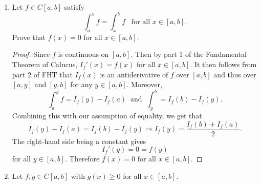 \documentclass[12pt]{article}
\begin{document}
\begin{enumerate}
\begin{proof}
                \begin{align*}
                    U(f, P)-L(f, P) &= \sum_{i=1}^{n}M_i\Delta
                    x_i-\sum_{i=1}^{n}m_i\Delta x_i \\
                    &=\sum_{i=1}^{n}(M_i-m_i)\Delta x_i \\
                    &=\sum_{i=1}^{n}(f(x_i)-f(x_{i-1}))\delta \\
                    &=\delta(f(b)-f(a)) \\
                    &<\frac{\varepsilon}{f(b)-f(a)}(f(b)-f(a))=\varepsilon.
                \end{align*}
                Therefore $f\in\mathcal{R}[a, b]$. 
            \end{proof}
        \item Let $f\in C[a, b]$ satisfy
            \begin{equation*}
                \int_{a}^{x}f=\int_{x}^bf\;\;\;\text{for all $x\in[a, b]$.}
            \end{equation*}
            Prove that $f(x)=0$ for all $x\in[a, b]$. 
            \begin{proof}
                Since $f$ is continuous on $[a, b]$. Then by part 1 of
                the Fundamental Theorem of Calucus, $I_f'(x)=f(x)$ for all
                $x\in[a, b]$. It then follows from part 2 of FHT that $I_f(x)$
                is an antiderivative of $f$ over $[a, b]$ and thus over $[a,
                y]$ and $[y, b]$ for any $y\in[a, b]$. Moreover, 
                \begin{equation*}
                    \int_{a}^y
                    f=I_f(y)-I_f(a)\;\;\text{and}\;\;\int_{y}^b=I_f(b)-I_f(y).
                \end{equation*}
                Combining this with our assumption of equality, we get that 
                \begin{equation*}
                    I_f(y)-I_f(a)=I_f(b)-I_f(y)\Rightarrow
                    I_f(y)=\frac{I_f(b)+I_f(a)}{2}.
                \end{equation*}
                The right-hand side being a constant gives 
                \begin{equation*}
                    I_f'(y)=0=f(y)
                \end{equation*}
                for all $y\in [a, b]$. Therefore $f(x)=0$ for all $x\in[a, b]$.
            \end{proof}
        \item Let $f, g\in C[a, b]$ with $g(x)\geq 0$ for all $x\in[a, b]$.

\end{enumerate}
\end{document}
